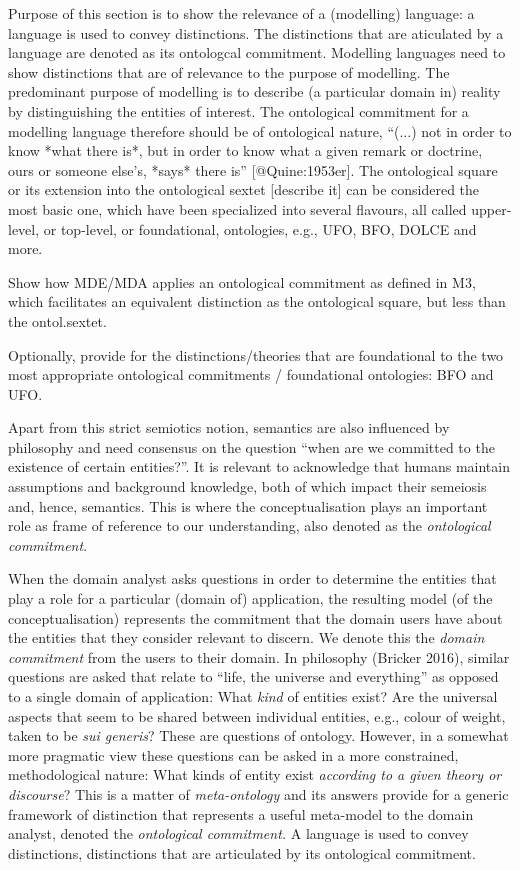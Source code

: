\documentclass[a4paper,11pt,oneside,oldfontcommands]{memoir}
\theoremstyle{definition}
\theoremstyle{break}		%
\numberwithin{equation}{chapter}
\numberwithin{figure}{chapter}
\begin{document}
\begin{synopsis}
Purpose of this section is to show the relevance of a (modelling) language: a language is used to convey distinctions. The distinctions that are aticulated by a language are denoted as its ontologcal commitment. Modelling languages need to show distinctions that are of relevance to the purpose of modelling. The predominant purpose of modelling is to describe (a particular domain in) reality by distinguishing the entities of interest. The ontological commitment for a modelling language therefore should be of ontological nature, “(...) not in order to know *what there is*, but in order to know what a given remark or doctrine, ours or someone else’s, *says* there is” [@Quine:1953er]. The ontological square or its extension into the ontological sextet [describe it] can be considered the most basic one, which have been specialized into several flavours, all called upper-level, or top-level, or foundational, ontologies, e.g., UFO, BFO, DOLCE and more. 

Show how MDE/MDA applies an ontological commitment as defined in M3, which facilitates an equivalent distinction as the ontological square, but less than the ontol.sextet.
 
Optionally, provide for the distinctions/theories that are foundational to the two most appropriate ontological commitments / foundational ontologies: BFO and UFO.
\end{synopsis}

Apart from this strict semiotics notion, semantics are also influenced
by philosophy and need consensus on the question ``when are we committed
to the existence of certain entities?''. It is relevant to acknowledge
that humans maintain assumptions and background knowledge, both of which
impact their semeiosis and, hence, semantics. This is where the
conceptualisation plays an important role as frame of reference to our
understanding, also denoted as the \emph{ontological commitment}.

When the domain analyst asks questions in order to determine the
entities that play a role for a particular (domain of) application, the
resulting model (of the conceptualisation) represents the commitment
that the domain users have about the entities that they consider
relevant to discern. We denote this the \emph{domain commitment} from
the users to their domain. In philosophy (Bricker 2016), similar
questions are asked that relate to ``life, the universe and everything''
as opposed to a single domain of application: What \emph{kind} of
entities exist? Are the universal aspects that seem to be shared between
individual entities, e.g., colour of weight, taken to be \emph{sui
generis}? These are questions of ontology. However, in a somewhat more
pragmatic view these questions can be asked in a more constrained,
methodological nature: What kinds of entity exist \emph{according to a
given theory or discourse}? This is a matter of \emph{meta-ontology} and
its answers provide for a generic framework of distinction that
represents a useful meta-model to the domain analyst, denoted the
\emph{ontological commitment. }A language is used to convey
distinctions, distinctions that are articulated by its ontological
commitment.
\end{document}

